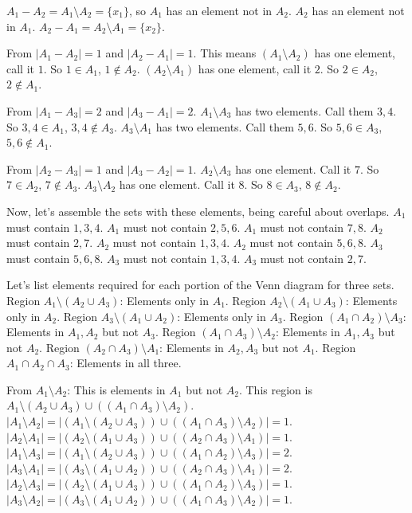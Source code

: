 \documentclass{article}
\begin{document}
\begin{itemize}
\begin{itemize}
\begin{itemize}
$A_1 - A_2 = A_1 \setminus A_2 = \{x_1\}$, so $A_1$ has an element not in $A_2$. $A_2$ has an element not in $A_1$.
$A_2 - A_1 = A_2 \setminus A_1 = \{x_2\}$.

From $|A_1 - A_2| = 1$ and $|A_2 - A_1| = 1$.
This means $(A_1 \setminus A_2)$ has one element, call it $1$. So $1 \in A_1$, $1 \notin A_2$.
$(A_2 \setminus A_1)$ has one element, call it $2$. So $2 \in A_2$, $2 \notin A_1$.

From $|A_1 - A_3| = 2$ and $|A_3 - A_1| = 2$.
$A_1 \setminus A_3$ has two elements. Call them $3, 4$. So $3, 4 \in A_1$, $3, 4 \notin A_3$.
$A_3 \setminus A_1$ has two elements. Call them $5, 6$. So $5, 6 \in A_3$, $5, 6 \notin A_1$.

From $|A_2 - A_3| = 1$ and $|A_3 - A_2| = 1$.
$A_2 \setminus A_3$ has one element. Call it $7$. So $7 \in A_2$, $7 \notin A_3$.
$A_3 \setminus A_2$ has one element. Call it $8$. So $8 \in A_3$, $8 \notin A_2$.

Now, let's assemble the sets with these elements, being careful about overlaps.
$A_1$ must contain $1, 3, 4$. $A_1$ must not contain $2, 5, 6$. $A_1$ must not contain $7, 8$.
$A_2$ must contain $2, 7$. $A_2$ must not contain $1, 3, 4$. $A_2$ must not contain $5, 6, 8$.
$A_3$ must contain $5, 6, 8$. $A_3$ must not contain $1, 3, 4$. $A_3$ must not contain $2, 7$.

Let's list elements required for each portion of the Venn diagram for three sets.
Region $A_1 \setminus (A_2 \cup A_3)$: Elements only in $A_1$.
Region $A_2 \setminus (A_1 \cup A_3)$: Elements only in $A_2$.
Region $A_3 \setminus (A_1 \cup A_2)$: Elements only in $A_3$.
Region $(A_1 \cap A_2) \setminus A_3$: Elements in $A_1, A_2$ but not $A_3$.
Region $(A_1 \cap A_3) \setminus A_2$: Elements in $A_1, A_3$ but not $A_2$.
Region $(A_2 \cap A_3) \setminus A_1$: Elements in $A_2, A_3$ but not $A_1$.
Region $A_1 \cap A_2 \cap A_3$: Elements in all three.

From $A_1 \setminus A_2$: This is elements in $A_1$ but not $A_2$. This region is $A_1 \setminus (A_2 \cup A_3) \cup ((A_1 \cap A_3) \setminus A_2)$.
$|A_1 \setminus A_2| = |(A_1 \setminus (A_2 \cup A_3)) \cup ((A_1 \cap A_3) \setminus A_2)| = 1$.
$|A_2 \setminus A_1| = |(A_2 \setminus (A_1 \cup A_3)) \cup ((A_2 \cap A_3) \setminus A_1)| = 1$.
$|A_1 \setminus A_3| = |(A_1 \setminus (A_2 \cup A_3)) \cup ((A_1 \cap A_2) \setminus A_3)| = 2$.
$|A_3 \setminus A_1| = |(A_3 \setminus (A_1 \cup A_2)) \cup ((A_2 \cap A_3) \setminus A_1)| = 2$.
$|A_2 \setminus A_3| = |(A_2 \setminus (A_1 \cup A_3)) \cup ((A_1 \cap A_2) \setminus A_3)| = 1$.
$|A_3 \setminus A_2| = |(A_3 \setminus (A_1 \cup A_2)) \cup ((A_1 \cap A_3) \setminus A_2)| = 1$.


\end{itemize}
\end{itemize}
\end{itemize}
\end{document}
